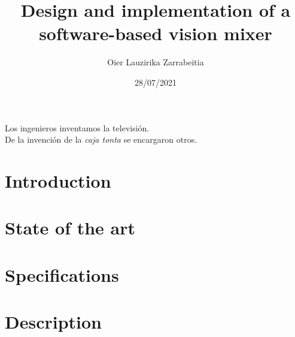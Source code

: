 \documentclass{etsist_pfg}
\title{Design and implementation of a software-based vision mixer}
\author{Oier Lauzirika Zarrabeitia}
\date{28/07/2021}
\begin{document}


\thispagestyle{empty}\clearpage\null\newpage

\thispagestyle{empty}
\vspace*{\fill}
\begin{flushright}
Los ingenieros inventamos la televisión. \\
De la invención de la \textit{caja tonta} se encargaron otros.
\end{flushright}
\vspace*{\fill}
\newpage

\begin{otherlanguage}{spanish}
\begin{abstract}
    
\end{abstract}
\end{otherlanguage}

\begin{abstract}
    
\end{abstract}

\tableofcontents

\listoffigures

\listoftables

\printglossary[type=\acronymtype]

\chapter{Introduction}


\chapter{State of the art}


\chapter{Specifications}


\chapter{Description}

\end{document}
